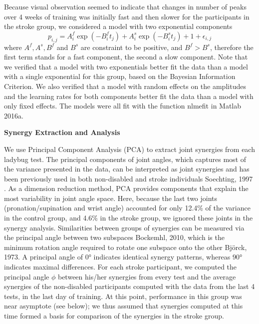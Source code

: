 Because visual observation seemed to indicate that changes in number of peaks over 4 weeks of training was initially fast and then slower for the participants in the stroke group, we considered a model with two exponential components 
\begin{equation}\label{eqn:doubleexp}
p_{i,j} = A^f_{i} \exp(-B^f_{i} t_j) + A^s_{i} \exp(-B^s_{i} t_j) + 1 + \epsilon_{i,j}
\end{equation}
where $ A^f, A^s, B^f $ and $ B^s $ are constraint to be positive, and $ B^f > B^s $, therefore the first term stands for a fast component, the second a slow component. 
Note that we verified that a model with two exponentials better fit the data than a model with a single exponential for this group, based on the Bayesian Information Criterion. 
We also verified that a model with random effects on the amplitudes and the learning rates for both components better fit the data than a model with only fixed effects. 
The models were all fit with the function \textsf{nlmefit} in Matlab 2016a.


\textbf{Synergy Extraction and Analysis}

We use Principal Component Analysis (PCA) to extract joint synergies from each ladybug test.
The principal components of joint angles, which captures most of the variance presented in the data, can be interpreted as joint synergies and has been previously used in both non-disabled and stroke individuals {Soechting, 1997 }. 
As a dimension reduction method, PCA provides components that explain the most variability in joint angle space. 
Here, because the last two joints (pronation/supination and wrist angle) accounted for only 12.4\% of the variance in the control group, and 4.6\% in the stroke group, we ignored these joints in the synergy analysis.  
Similarities between groups of synergies can be measured via the principal angle between two subspaces {Bockemhl, 2010}, which is the minimum rotation angle required to rotate one subspace onto the other {Björck, 1973}. 
A principal angle of $ \ang{0} $ indicates identical synergy patterns, whereas $ \ang{90} $ indicates maximal differences.  
For each stroke participant, we computed the principal angle $ \phi $ between his/her synergies from every test and the average synergies of the non-disabled participants computed with the data from the last 4 tests, in the last day of training. 
At this point, performance in this group was near asymptote (see below); we thus assumed that synergies computed at this time formed a basis for comparison of the synergies in the stroke group. 

